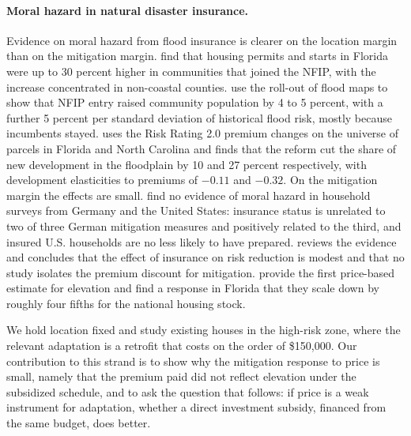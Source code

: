 \paragraph{Moral hazard in natural disaster insurance.}
Evidence on moral hazard from flood insurance is clearer on the location margin than on the mitigation margin. \citet{browne2019} find that housing permits and starts in Florida were up to 30 percent higher in communities that joined the NFIP, with the increase concentrated in non-coastal counties. \citet{peraltascott2024} use the roll-out of flood maps to show that NFIP entry raised community population by 4 to 5 percent, with a further 5 percent per standard deviation of historical flood risk, mostly because incumbents stayed. \citet{fabian2024} uses the Risk Rating 2.0 premium changes on the universe of parcels in Florida and North Carolina and finds that the reform cut the share of new development in the floodplain by 10 and 27 percent respectively, with development elasticities to premiums of $-0.11$ and $-0.32$. On the mitigation margin the effects are small. \citet{hudson2017} find no evidence of moral hazard in household surveys from Germany and the United States: insurance status is unrelated to two of three German mitigation measures and positively related to the third, and insured U.S. households are no less likely to have prepared. \citet{kousky2019} reviews the evidence and concludes that the effect of insurance on risk reduction is modest and that no study isolates the premium discount for mitigation. \citet{grubersolomon2026} provide the first price-based estimate for elevation and find a response in Florida that they scale down by roughly four fifths for the national housing stock.

We hold location fixed and study existing houses in the high-risk zone, where the relevant adaptation is a retrofit that costs on the order of \$150,000. Our contribution to this strand is to show why the mitigation response to price is small, namely that the premium paid did not reflect elevation under the subsidized schedule, and to ask the question that follows: if price is a weak instrument for adaptation, whether a direct investment subsidy, financed from the same budget, does better.

